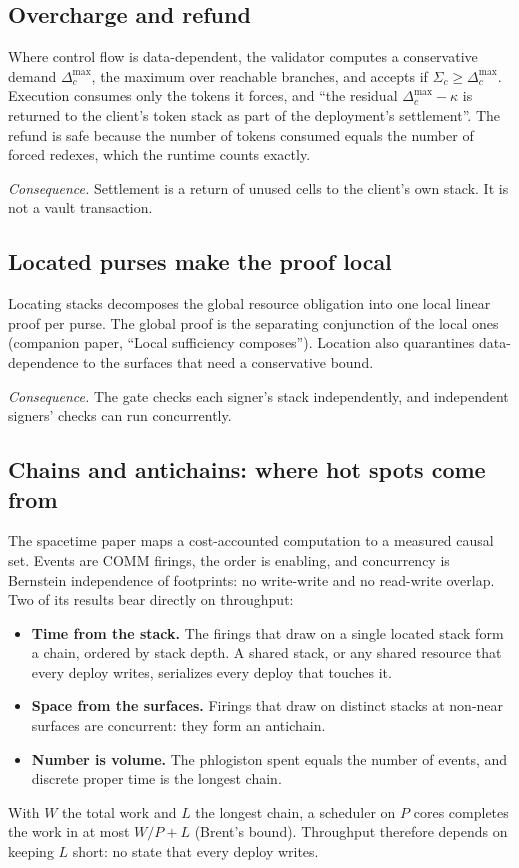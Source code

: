 \documentclass[11pt]{article}
\begin{document}
\subsection{Overcharge and refund}

Where control flow is data-dependent, the validator computes a conservative demand $\Delta^{\max}_c$, the maximum over reachable branches, and accepts if $\Sigma_c \ge \Delta^{\max}_c$. Execution consumes only the tokens it forces, and ``the residual $\Delta^{\max}_c - \kappa$ is returned to the client's token stack as part of the deployment's settlement''. The refund is safe because the number of tokens consumed equals the number of forced redexes, which the runtime counts exactly.

\emph{Consequence.} Settlement is a return of unused cells to the client's own stack. It is not a vault transaction.

\subsection{Located purses make the proof local}

Locating stacks decomposes the global resource obligation into one local linear proof per purse. The global proof is the separating conjunction of the local ones (companion paper, ``Local sufficiency composes''). Location also quarantines data-dependence to the surfaces that need a conservative bound.

\emph{Consequence.} The gate checks each signer's stack independently, and independent signers' checks can run concurrently.

\subsection{Chains and antichains: where hot spots come from}

The spacetime paper maps a cost-accounted computation to a measured causal set. Events are COMM firings, the order is enabling, and concurrency is Bernstein independence of footprints: no write-write and no read-write overlap. Two of its results bear directly on throughput:
\begin{itemize}
\item \textbf{Time from the stack.} The firings that draw on a single located stack form a chain, ordered by stack depth. A shared stack, or any shared resource that every deploy writes, serializes every deploy that touches it.
\item \textbf{Space from the surfaces.} Firings that draw on distinct stacks at non-near surfaces are concurrent: they form an antichain.
\item \textbf{Number is volume.} The phlogiston spent equals the number of events, and discrete proper time is the longest chain.
\end{itemize}
With $W$ the total work and $L$ the longest chain, a scheduler on $P$ cores completes the work in at most $W/P + L$ (Brent's bound). Throughput therefore depends on keeping $L$ short: no state that every deploy writes.
\end{document}
